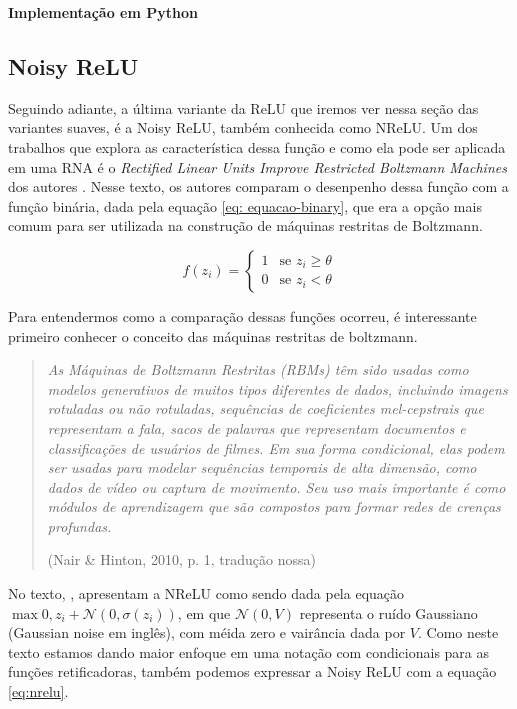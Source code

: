 \textbf{Implementação em Python}

\subsection{Noisy ReLU}

Seguindo adiante, a última variante da ReLU que iremos ver nessa seção das variantes suaves, é a Noisy ReLU, também conhecida como NReLU. Um dos trabalhos que explora as característica dessa função e como ela pode ser aplicada em uma RNA é o \textit{Rectified Linear Units Improve Restricted Boltzmann Machines} dos autores \textcite{Nair2010}. Nesse texto, os autores comparam o desenpenho dessa função com a função binária, dada pela equação \ref{eq: equacao-binary}, que era a opção mais comum para ser utilizada na construção de máquinas restritas de Boltzmann.

\begin{equation}
    f(z_i) = \begin{cases} 
    1 & \text{se } z_i \ge \theta \\ 
    0 & \text{se } z_i < \theta 
    \end{cases}
    \label{eq: equacao-binary}
\end{equation}

Para entendermos como a comparação dessas funções ocorreu, é interessante primeiro conhecer o conceito das máquinas restritas de boltzmann.

\begin{quote}
    \textit{As Máquinas de Boltzmann Restritas (RBMs) têm sido usadas como modelos generativos de muitos tipos diferentes de dados, incluindo imagens rotuladas ou não rotuladas, sequências de coeficientes mel-cepstrais que representam a fala, sacos de palavras que representam documentos e classificações de usuários de filmes. Em sua forma condicional, elas podem ser usadas para modelar sequências temporais de alta dimensão, como dados de vídeo ou captura de movimento. Seu uso mais importante é como módulos de aprendizagem que são compostos para formar redes de crenças profundas.}

\hfill \textemdash (Nair \& Hinton, 2010, p. 1, tradução nossa)
\end{quote}

No texto, \textcite{Nair2010}, apresentam a NReLU como sendo dada pela equação $\max{0, z_i + \mathcal{N}(0, \sigma(z_i))}$, em que $\mathcal{N}(0, V)$ representa o ruído Gaussiano (Gaussian noise em inglês), com méida zero e vairância dada por $V$. Como neste texto estamos dando maior enfoque em uma notação com condicionais para as funções retificadoras, também podemos expressar a Noisy ReLU com a equação \ref{eq:nrelu}.

